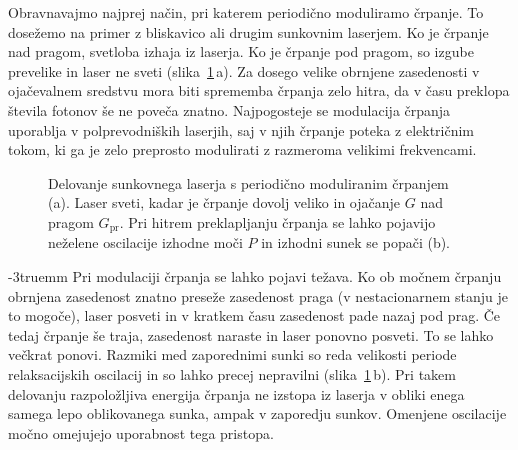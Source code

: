 Obravnavajmo najprej način, pri katerem periodično moduliramo črpanje.
To dosežemo na primer z bliskavico ali drugim sunkovnim laserjem. Ko je 
črpanje nad pragom, svetloba izhaja iz laserja.
Ko je črpanje pod pragom, so izgube prevelike in laser ne sveti (slika~\ref{fig:Gswitch}\,a). Za dosego velike
obrnjene zasedenosti v ojačevalnem sredstvu mora biti sprememba črpanja zelo hitra, 
da v času preklopa števila fotonov še ne poveča znatno. 
Najpogosteje se modulacija črpanja uporablja
v polprevodniških laserjih, saj v njih črpanje poteka z električnim tokom, ki 
ga je zelo preprosto modulirati z razmeroma velikimi frekvencami. 
\begin{figure}[ht]
\centering
\def\svgwidth{120truemm} 

\caption{Delovanje sunkovnega laserja s periodično moduliranim črpanjem (a). Laser sveti,
kadar je črpanje dovolj veliko in ojačanje $G$ nad pragom $G_{\mathrm{pr}}$. 
Pri hitrem preklapljanju črpanja se lahko pojavijo neželene oscilacije izhodne moči $P$ in 
izhodni sunek se popači (b).}
\label{fig:Gswitch}
\end{figure}
\vglue-3truemm
Pri modulaciji črpanja se lahko pojavi težava. Ko ob močnem črpanju 
obrnjena zasedenost znatno preseže zasedenost praga (v nestacionarnem stanju 
je to mogoče), laser posveti in v kratkem času zasedenost pade nazaj pod prag. 
Če tedaj črpanje še traja, zasedenost naraste in laser ponovno posveti. 
To se lahko večkrat ponovi. Razmiki med zaporednimi sunki
so reda velikosti periode relaksacijskih oscilacij in so lahko precej
nepravilni  (slika~\ref{fig:Gswitch}\,b). Pri takem delovanju
razpoložljiva energija črpanja ne izstopa iz laserja v obliki enega samega lepo oblikovanega sunka, 
ampak v zaporedju sunkov. Omenjene oscilacije močno omejujejo uporabnost tega pristopa.

